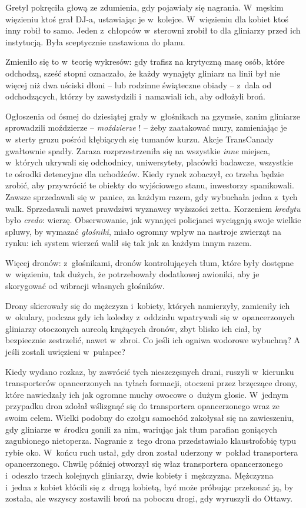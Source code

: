 \documentclass[oneside,polish,11pt,sfheadings]{mwbk}
\begin{document}
Gretyl pokręciła głową ze zdumienia, gdy pojawiały się nagrania. W~męskim więzieniu ktoś grał DJ-a, ustawiając je w~kolejce. W~więzieniu
dla kobiet ktoś inny robił to samo. Jeden z~chłopców w~sterowni zrobił
to dla gliniarzy przed ich instytucją. Była sceptycznie nastawiona do
planu.

Zmieniło się to w~teorię wykresów: gdy trafisz na krytyczną masę osób,
które odchodzą, sześć stopni oznaczało, że każdy wynajęty gliniarz na
linii był nie więcej niż dwa uściski dłoni -- lub rodzinne świąteczne
obiady -- z~dala od odchodzących, którzy by zawstydzili i~namawiali ich,
aby odłożyli broń.

Ogłoszenia od ósmej do dziesiątej grały w~głośnikach na gzymsie, zanim
gliniarze sprowadzili moździerze -- \textit{moździerze }! -- żeby zaatakować
mury, zamieniając je w~sterty gruzu pośród kłębiących się tumanów kurzu.
Akcje TransCanady gwałtownie spadły. Zaraza rozprzestrzeniła się na
wszystkie \textit{inne} miejsca, w~których ukrywali się odchodnicy,
uniwersytety, placówki badawcze, wszystkie te ośrodki detencyjne dla
uchodźców. Kiedy rynek zobaczył, co trzeba będzie zrobić, aby przywrócić
te obiekty do wyjściowego stanu, inwestorzy spanikowali. Zawsze
sprzedawali się w~panice, za każdym razem, gdy wybuchała jedna z~tych
walk. Sprzedawali nawet prawdziwi wyznawcy wyższości zetta. Korzeniem
\textit{kredytu} było \textit{credo}: wierzę. Obserwowanie, jak wynajęci
policjanci wyciągają swoje wielkie spluwy, by wymazać \textit{głośniki},
miało ogromny wpływ na nastroje zwierząt na rynku: ich system wierzeń
walił się tak jak za każdym innym razem.

Więcej dronów: z~głośnikami, dronów kontrolujących tłum, które były
dostępne w~więzieniu, tak dużych, że potrzebowały dodatkowej awioniki,
aby je skorygować od wibracji własnych głośników.

Drony skierowały się do mężczyzn i~kobiety, których namierzyły,
zamieniły ich w~okulary, podczas gdy ich koledzy z~oddziału wpatrywali
się w~opancerzonych gliniarzy otoczonych aureolą krążących dronów, zbyt
blisko ich ciał, by bezpiecznie zestrzelić, nawet w~zbroi. Co jeśli ich
ogniwa wodorowe wybuchną? A jeśli zostali uwięzieni w~pułapce?

Kiedy wydano rozkaz, by zawrócić tych nieszczęsnych drani, ruszyli w~kierunku transporterów opancerzonych na tyłach formacji, otoczeni przez
brzęczące drony, które nawiedzały ich jak ogromne muchy owocowe o~dużym
głosie. W~jednym przypadku dron zdołał wślizgnąć się do transportera
opancerzonego wraz ze swoim celem. Wielki podobny do czołgu samochód
zakołysał się na zawieszeniu, gdy gliniarze w~środku gonili za nim,
wariując jak tłum parafian goniących zagubionego nietoperza. Nagranie z~tego drona przedstawiało klaustrofobię typu rybie oko. W~końcu ruch
ustał, gdy dron został uderzony w~pokład transportera opancerzonego.
Chwilę później otworzył się właz transportera opancerzonego i~odeszło
trzech kolejnych gliniarzy, dwie kobiety i~mężczyzna. Mężczyzna i~jedna
z kobiet kłócili się z~drugą kobietą, być może próbując przekonać ją, by
została, ale wszyscy zostawili broń na poboczu drogi, gdy wyruszyli do
Ottawy.
\end{document}
